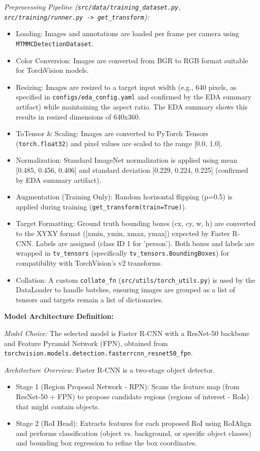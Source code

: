 \textit{Preprocessing Pipeline (\texttt{src/data/training\_dataset.py}, \texttt{src/training/runner.py -> get\_transform}):}
\begin{itemize}
    \item Loading: Images and annotations are loaded per frame per camera using \texttt{MTMMCDetectionDataset}.
    \item Color Conversion: Images are converted from BGR to RGB format suitable for TorchVision models.
    \item Resizing: Images are resized to a target input width (e.g., 640 pixels, as specified in \texttt{configs/eda\_config.yaml} and confirmed by the EDA summary artifact) while maintaining the aspect ratio. The EDA summary shows this results in resized dimensions of 640x360.
    \item ToTensor \& Scaling: Images are converted to PyTorch Tensors (\texttt{torch.float32}) and pixel values are scaled to the range [0.0, 1.0].
    \item Normalization: Standard ImageNet normalization is applied using mean [0.485, 0.456, 0.406] and standard deviation [0.229, 0.224, 0.225] (confirmed by EDA summary artifact).
    \item Augmentation (Training Only): Random horizontal flipping (p=0.5) is applied during training (\texttt{get\_transform(train=True)}).
    \item Target Formatting: Ground truth bounding boxes (cx, cy, w, h) are converted to the XYXY format ([xmin, ymin, xmax, ymax]) expected by Faster R-CNN. Labels are assigned (class ID 1 for 'person'). Both boxes and labels are wrapped in \texttt{tv\_tensors} (specifically \texttt{tv\_tensors.BoundingBoxes}) for compatibility with TorchVision's v2 transforms.
    \item Collation: A custom \texttt{collate\_fn} (\texttt{src/utils/torch\_utils.py}) is used by the DataLoader to handle batches, ensuring images are grouped as a list of tensors and targets remain a list of dictionaries.
\end{itemize}

\textbf{Model Architecture Definition:}

\textit{Model Choice:} The selected model is Faster R-CNN with a ResNet-50 backbone and Feature Pyramid Network (FPN), obtained from \texttt{torchvision.models.detection.fasterrcnn\_resnet50\_fpn}.

\textit{Architecture Overview:} Faster R-CNN is a two-stage object detector.
\begin{itemize}
    \item Stage 1 (Region Proposal Network - RPN): Scans the feature map (from ResNet-50 + FPN) to propose candidate regions (regions of interest - RoIs) that might contain objects.
    \item Stage 2 (RoI Head): Extracts features for each proposed RoI using RoIAlign and performs classification (object vs. background, or specific object classes) and bounding box regression to refine the box coordinates.
\end{itemize}

